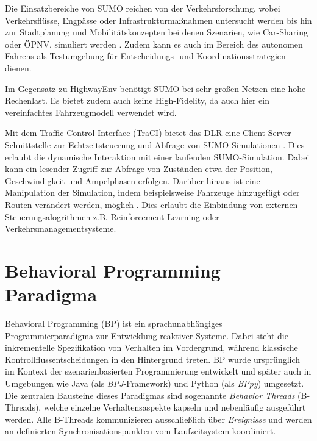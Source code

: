 Die Einsatzbereiche von SUMO reichen von der Verkehrsforschung, wobei Verkehrsflüsse, Engpässe oder Infrastrukturmaßnahmen untersucht werden bis hin zur Stadtplanung und Mobilitätskonzepten bei denen Szenarien, wie Car-Sharing oder ÖPNV, simuliert werden \cite{SUMO2018}. Zudem kann es auch im Bereich des autonomen Fahrens als Testumgebung für Entscheidungs- und Koordinationsstrategien dienen.

Im Gegensatz zu HighwayEnv benötigt SUMO bei sehr großen Netzen eine hohe Rechenlast. Es bietet zudem auch keine High-Fidelity, da auch hier ein vereinfachtes Fahrzeugmodell verwendet wird.

Mit dem Traffic Control Interface (TraCI) bietet das DLR eine Client-Server-Schnittstelle zur Echtzeitsteuerung und Abfrage von SUMO-Simulationen \cite{sumo_traci}. Dies erlaubt die dynamische Interaktion mit einer laufenden SUMO-Simulation. Dabei kann ein lesender Zugriff zur Abfrage von Zuständen etwa der Position, Geschwindigkeit und Ampelphasen erfolgen. Darüber hinaus ist eine Manipulation der Simulation, indem beispielsweise Fahrzeuge hinzugefügt oder Routen verändert werden, möglich \cite{sumo_traci}. Dies erlaubt die Einbindung von externen Steuerungsalogrithmen z.B. Reinforcement-Learning oder Verkehrsmanagementsysteme.

\section{Behavioral Programming Paradigma}\label{sec:behavioral-programming}
Behavioral Programming (BP) ist ein sprachunabhängiges Programmierparadigma zur Entwicklung reaktiver Systeme\cite{Harel2012}.
Dabei steht die inkrementelle Spezifikation von Verhalten im Vordergrund, während klassische Kontrollflussentscheidungen in den Hintergrund treten\cite{Harel2012}.
BP wurde ursprünglich im Kontext der szenarienbasierten Programmierung entwickelt und später auch in Umgebungen wie Java (als \emph{BPJ}-Framework) und Python (als \emph{BPpy}) umgesetzt\cite{Harel2010}.
Die zentralen Bausteine dieses Paradigmas sind sogenannte \emph{Behavior Threads} (B-Threads), welche einzelne Verhaltensaspekte kapseln und nebenläufig ausgeführt werden\cite{Harel2010}.
Alle B-Threads kommunizieren ausschließlich über \emph{Ereignisse} und werden an definierten Synchronisationspunkten vom Laufzeitsystem koordiniert\cite{Harel2012}.

